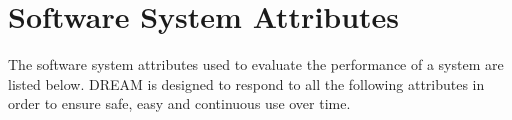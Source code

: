 \section{Software System Attributes}

The software system attributes used to evaluate the performance of a system are listed below. DREAM is designed to respond to all the following attributes in order to ensure safe, easy and continuous use over time.






